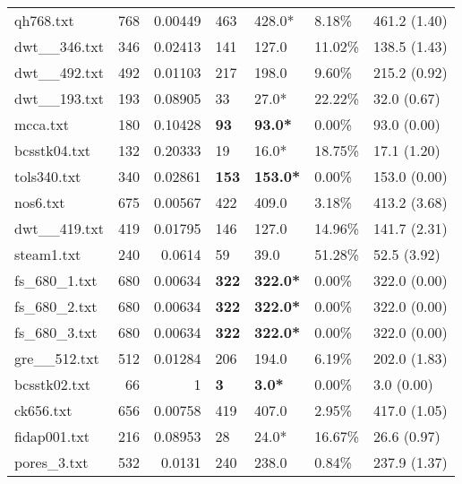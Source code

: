 \begin{table}[h]
\begin{tabular}{lrrllll}
 qh768.txt          &     768 &     0.00449 & 463          & 428.0*          & 8.18\%   & 461.2 (1.40)   \\
 dwt__346.txt       &     346 &     0.02413 & 141          & 127.0           & 11.02\%  & 138.5 (1.43)   \\
 dwt__492.txt       &     492 &     0.01103 & 217          & 198.0           & 9.60\%   & 215.2 (0.92)   \\
 dwt__193.txt       &     193 &     0.08905 & 33           & 27.0*           & 22.22\%  & 32.0 (0.67)    \\
 mcca.txt           &     180 &     0.10428 & \textbf{93}  & \textbf{93.0*}  & 0.00\%   & 93.0 (0.00)    \\
 bcsstk04.txt       &     132 &     0.20333 & 19           & 16.0*           & 18.75\%  & 17.1 (1.20)    \\
 tols340.txt        &     340 &     0.02861 & \textbf{153} & \textbf{153.0*} & 0.00\%   & 153.0 (0.00)   \\
 nos6.txt           &     675 &     0.00567 & 422          & 409.0           & 3.18\%   & 413.2 (3.68)   \\
 dwt__419.txt       &     419 &     0.01795 & 146          & 127.0           & 14.96\%  & 141.7 (2.31)   \\
 steam1.txt         &     240 &     0.0614  & 59           & 39.0            & 51.28\%  & 52.5 (3.92)    \\
 fs_680_1.txt       &     680 &     0.00634 & \textbf{322} & \textbf{322.0*} & 0.00\%   & 322.0 (0.00)   \\
 fs_680_2.txt       &     680 &     0.00634 & \textbf{322} & \textbf{322.0*} & 0.00\%   & 322.0 (0.00)   \\
 fs_680_3.txt       &     680 &     0.00634 & \textbf{322} & \textbf{322.0*} & 0.00\%   & 322.0 (0.00)   \\
 gre__512.txt       &     512 &     0.01284 & 206          & 194.0           & 6.19\%   & 202.0 (1.83)   \\
 bcsstk02.txt       &      66 &     1       & \textbf{3}   & \textbf{3.0*}   & 0.00\%   & 3.0 (0.00)     \\
 ck656.txt          &     656 &     0.00758 & 419          & 407.0           & 2.95\%   & 417.0 (1.05)   \\
 fidap001.txt       &     216 &     0.08953 & 28           & 24.0*           & 16.67\%  & 26.6 (0.97)    \\
 pores_3.txt        &     532 &     0.0131  & 240          & 238.0           & 0.84\%   & 237.9 (1.37)   \\

\end{tabular}
\end{table}
